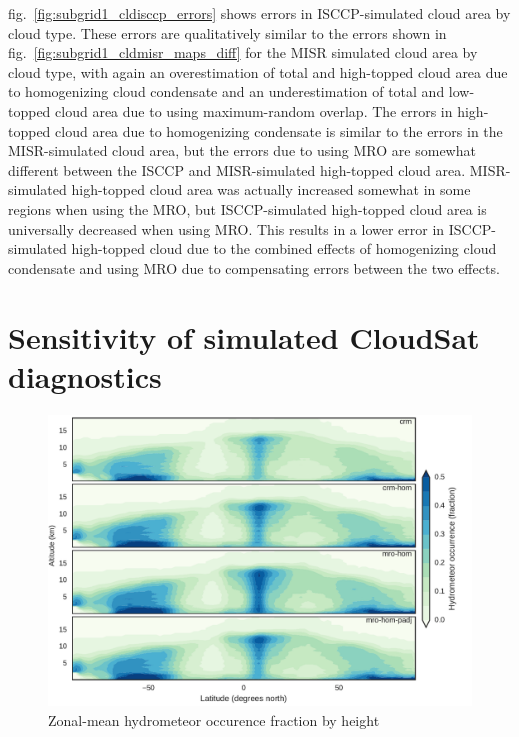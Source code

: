 fig.~\ref{fig:subgrid1_cldisccp_errors} shows errors in ISCCP-simulated
cloud area by cloud type. These errors are qualitatively similar to the
errors shown in fig.~\ref{fig:subgrid1_cldmisr_maps_diff} for the MISR
simulated cloud area by cloud type, with again an overestimation of
total and high-topped cloud area due to homogenizing cloud condensate
and an underestimation of total and low-topped cloud area due to using
maximum-random overlap. The errors in high-topped cloud area due to
homogenizing condensate is similar to the errors in the MISR-simulated
cloud area, but the errors due to using MRO are somewhat different
between the ISCCP and MISR-simulated high-topped cloud area.
MISR-simulated high-topped cloud area was actually increased somewhat in
some regions when using the MRO, but ISCCP-simulated high-topped cloud
area is universally decreased when using MRO. This results in a lower
error in ISCCP-simulated high-topped cloud due to the combined effects
of homogenizing cloud condensate and using MRO due to compensating
errors between the two effects.

\section{Sensitivity of simulated CloudSat
diagnostics}\label{sensitivity-of-simulated-cloudsat-diagnostics}

\begin{figure}[htbp]
\centering
\includegraphics{graphics/subgrid1_hfba_zonal.pdf}
\caption{\label{fig:subgrid1_hfba_zonal}Zonal-mean hydrometeor occurence
fraction by height}\label{fig:subgrid1ux5fhfbaux5fzonal}
\end{figure}

